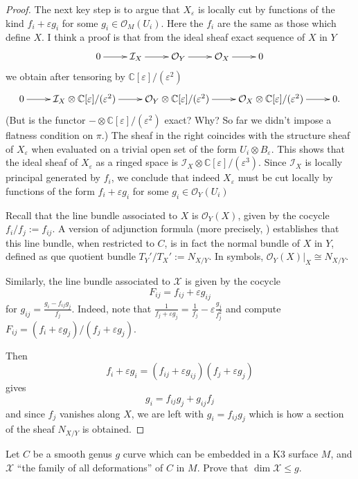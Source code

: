 \begin{proof}
The next key step is to argue that
$X_\varepsilon$ is locally cut by
functions of the kind $f_i + \varepsilon g_i$ 
for some $g_i \in \mathcal{O}_M(U_i)$.
Here the $f_i$ are the same as those which define $X$.
I think a proof is that from the ideal sheaf
exact sequence of $X$ in $Y$
$$
\xymatrix{
0\ar[r]
&\mathcal{I}_X\ar[r]
&\mathcal{O}_Y\ar[r]
&\mathcal{O}_X\ar[r]
&0
}
$$
we obtain after tensoring by $\mathbb{C}[\varepsilon]/(\varepsilon^2)$
$$
\xymatrix{
0\ar[r]
&\mathcal{I}_X \otimes \mathbb{C}[\varepsilon]/(\varepsilon^2)\ar[r]
&\mathcal{O}_Y \otimes \mathbb{C}[\varepsilon]/(\varepsilon^2)\ar[r]
&\mathcal{O}_X \otimes \mathbb{C}[\varepsilon]/(\varepsilon^2)\ar[r]
&0.
}
$$
(But is the functor $-\otimes \mathbb{C}[\varepsilon]/(\varepsilon^2)$ 
exact? Why? So far we didn't impose a flatness condition on $\pi$.)
The sheaf in the right
coincides with the structure sheaf of $X_\varepsilon$ when 
evaluated on a trivial open set of the form
$U_i \otimes B_\varepsilon$.
This shows that the ideal sheaf of $X_\varepsilon$ 
as a ringed space is
$\mathcal{I}_X \otimes\mathbb{C}[\varepsilon]/(\varepsilon^3)$.
Since $\mathcal{I}_X$ is locally principal generated by $f_i$,
we conclude that indeed $X_\varepsilon$ 
must be cut locally by functions of the form $f_i + \varepsilon g_i$
for some $g_i \in \mathcal{O}_Y(U_i)$

Recall that the line bundle associated to $X$
is $\mathcal{O}_Y(X)$, given by the cocycle $f_i/f_j:=f_{ij}$.
A version of adjunction formula
(more precisely, \cite[Adjunction formula I, p. 146]{GH})
establishes that this line bundle,
when restricted to $C$, is in fact
the normal bundle of $X$ in $Y$, defined as que quotient
bundle $T_Y'/T_X':=N_{X/Y}$.
In symbols, $\mathcal{O}_Y(X)|_{X}\cong N_{X/Y}$.

Similarly, the line bundle associated to $\mathcal{X}$ 
is given by the cocycle
$$
F_{ij}=f_{ij}+\varepsilon g_{ij}
$$
for $g_{ij}=\frac{g_i-f_{ij}g_j}{f_j}$.
Indeed, note that 
$\frac{1}{f_j+\varepsilon g_j}=\frac{1}{f_j}-\varepsilon \frac{g_j}{f^2_j}$ 
and compute $F_{ij}=(f_i+\varepsilon g_j)/(f_j+\varepsilon g_j)$.

Then
$$
f_i+\varepsilon g_i=(f_{ij}+\varepsilon g_{ij})(f_j+\varepsilon g_j)
$$
gives
$$
g_i=f_{ij}g_j+g_{ij}f_j
$$
and since $f_j$ vanishes along $X$,
we are left with $g_i=f_{ij}g_j$ 
which is how a section of the sheaf $N_{X/Y}$
is obtained.
\end{proof}

\begin{exercise}
\label{exercise-deformations-curve-in-k3}
Let $C$ be a smooth genus $g$ curve which
can be embedded in a K3 surface $M$, and $\mathcal{X}$ 
``the family of all deformations'' of $C$ in $M$.
Prove that $\dim \mathcal{X} \leq g$.
\end{exercise}

